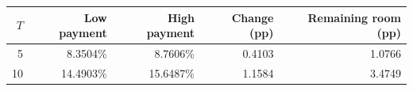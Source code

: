 \begin{tabular}{rrrrr}
\toprule
$T$ & Low payment & High payment & Change (pp) & Remaining room (pp)\\
\midrule
5 & 8.3504\% & 8.7606\% & 0.4103 & 1.0766 \\
10 & 14.4903\% & 15.6487\% & 1.1584 & 3.4749 \\
\bottomrule
\end{tabular}
